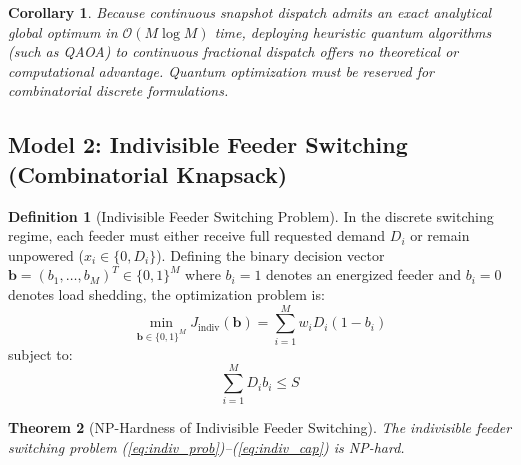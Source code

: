 \documentclass[11pt,a4paper]{article}
\newtheorem{theorem}{Theorem}
\newtheorem{corollary}[theorem]{Corollary}
\theoremstyle{definition}
\newtheorem{definition}{Definition}
\theoremstyle{remark}
\begin{document}
\begin{corollary}
Because continuous snapshot dispatch admits an exact analytical global optimum in $\mathcal{O}(M \log M)$ time, deploying heuristic quantum algorithms (such as QAOA) to continuous fractional dispatch offers no theoretical or computational advantage. Quantum optimization must be reserved for combinatorial discrete formulations.
\end{corollary}

\subsection{Model 2: Indivisible Feeder Switching (Combinatorial Knapsack)}
\begin{definition}[Indivisible Feeder Switching Problem]
In the discrete switching regime, each feeder must either receive full requested demand $D_i$ or remain unpowered ($x_i \in \{0, D_i\}$). Defining the binary decision vector $\mathbf{b} = (b_1, \dots, b_M)^T \in \{0, 1\}^M$ where $b_i = 1$ denotes an energized feeder and $b_i = 0$ denotes load shedding, the optimization problem is:
\begin{equation}
\min_{\mathbf{b} \in \{0, 1\}^M} J_{\text{indiv}}(\mathbf{b}) = \sum_{i=1}^M w_i D_i (1 - b_i)
\label{eq:indiv_prob}
\end{equation}
subject to:
\begin{equation}
\sum_{i=1}^M D_i b_i \le S
\label{eq:indiv_cap}
\end{equation}
\end{definition}

\begin{theorem}[NP-Hardness of Indivisible Feeder Switching]
The indivisible feeder switching problem (\ref{eq:indiv_prob})--(\ref{eq:indiv_cap}) is NP-hard.
\end{theorem}
\end{document}
